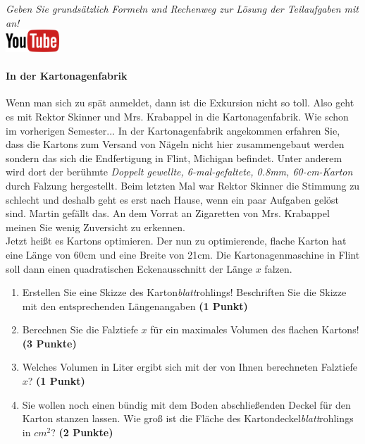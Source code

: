 \documentclass[a4paper, 9pt]{scrartcl}\usepackage[]{graphicx}\usepackage[]{xcolor}
\begin{document}
\textit{Geben Sie grunds{\"a}tzlich Formeln und Rechenweg zur L{\"o}sung der
  Teilaufgaben mit an!} \\[1Ex]

\hfill\href{https://youtu.be/RuzMjwvwT-4}{\includegraphics[width =
  2cm]{img/youtube}} %
\hspace{2Ex}

\paragraph{In der Kartonagenfabrik}



Wenn man sich zu sp{\"a}t anmeldet, dann ist die Exkursion nicht so toll. Also
geht es mit Rektor Skinner und Mrs. Krabappel in die Kartonagenfabrik. Wie
schon im vorherigen Semester... In der Kartonagenfabrik angekommen erfahren
Sie, dass die Kartons zum Versand von N{\"a}geln nicht hier zusammengebaut
werden sondern das sich die Endfertigung in Flint, Michigan befindet. Unter
anderem wird dort der ber{\"u}hmte \textit{Doppelt gewellte,
  6-mal-gefaltete, 0.8mm, 60-cm-Karton} durch
Falzung hergestellt. Beim letzten Mal war Rektor Skinner die Stimmung zu
schlecht und deshalb geht es erst nach Hause, wenn ein paar Aufgaben gel{\"o}st
sind. Martin gef{\"a}llt das. An dem Vorrat
an Zigaretten von Mrs. Krabappel meinen Sie wenig Zuversicht zu erkennen.\\

Jetzt hei{\ss}t es Kartons optimieren. Der nun zu optimierende, flache Karton
hat eine L{\"a}nge von 60cm und eine Breite von 21cm. Die
Kartonagenmaschine in Flint soll dann einen quadratischen Eckenausschnitt
der L{\"a}nge $x$ falzen.

\begin{enumerate}
\item Erstellen Sie eine Skizze des Karton\textit{blatt}rohlings!
  Beschriften Sie die Skizze mit den entsprechenden L{\"a}ngenangaben
  \textbf{(1 Punkt)}
\item Berechnen Sie die Falztiefe $x$ f{\"u}r ein maximales Volumen des flachen
  Kartons! \textbf{(3 Punkte)}
\item Welches Volumen in Liter ergibt sich mit der von Ihnen berechneten
  Falztiefe $x$?  \textbf{(1 Punkt)}
\item Sie wollen noch einen b{\"u}ndig mit dem Boden abschlie{\ss}enden Deckel f{\"u}r
  den Karton stanzen lassen. Wie gro{\ss} ist die Fl{\"a}che des
  Kartondeckel\textit{blatt}rohlings in $cm^2$? \textbf{(2 Punkte)}
\end{enumerate}
\end{document}
